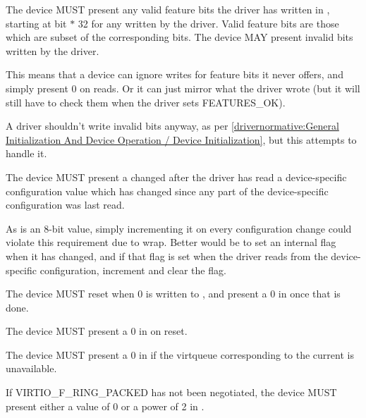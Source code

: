 The device MUST present any valid feature bits the driver has written in , starting at bit  $*$ 32 for any  written by the driver.  Valid feature bits are those which are subset of the corresponding  bits.  The device MAY present invalid bits written by the driver.

\begin{note}
  This means that a device can ignore writes for feature bits it never
  offers, and simply present 0 on reads.  Or it can just mirror what the driver wrote
  (but it will still have to check them when the driver sets FEATURES_OK).
\end{note}

\begin{note}
  A driver shouldn't write invalid bits anyway, as per \ref{drivernormative:General Initialization And Device Operation / Device Initialization}, but this attempts to handle it.
\end{note}

The device MUST present a changed  after the
driver has read a device-specific configuration value which has
changed since any part of the device-specific configuration was last
read.
\begin{note}
As  is an 8-bit value, simply incrementing it
on every configuration change could violate this requirement due to wrap.
Better would be to set an internal flag when it has changed,
and if that flag is set when the driver reads from the device-specific
configuration, increment  and clear the flag.
\end{note}

The device MUST reset when 0 is written to , and
present a 0 in  once that is done.

The device MUST present a 0 in  on reset.

The device MUST present a 0 in  if the virtqueue
corresponding to the current  is unavailable.

If VIRTIO_F_RING_PACKED has not been negotiated, the device MUST
present either a value of 0 or a power of 2 in
.


